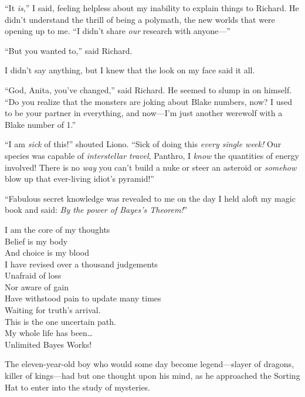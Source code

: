 “It \emph{is},” I said, feeling helpless about my inability to explain things to Richard. He didn’t understand the thrill of being a polymath, the new worlds that were opening up to me. “I didn’t share \emph{our} research with anyone—”

“But you wanted to,” said Richard.

I didn’t say anything, but I knew that the look on my face said it all.

“God, Anita, you’ve changed,” said Richard. He seemed to slump in on himself. “Do you realize that the monsters are joking about Blake numbers, now? I used to be your partner in everything, and now—I’m just another werewolf with a Blake number of 1.”


“I am \emph{sick} of this!” shouted Liono. “Sick of doing this \emph{every single week!} Our species was capable of \emph{interstellar travel}, Panthro, I \emph{know} the quantities of energy involved! There is no \emph{way} you can’t build a nuke or steer an asteroid or \emph{somehow} blow up that ever-living idiot’s pyramid!”

\clearpage
{}

“Fabulous secret knowledge was revealed to me on the day I held aloft my magic book and said: \emph{By the power of Bayes’s Theorem!}”


\begin{emph}
I am the core of my thoughts\\
Belief is my body\\
And choice is my blood\\
I have revised over a thousand judgements\\
Unafraid of loss\\
Nor aware of gain\\
Have withstood pain to update many times\\
Waiting for truth’s arrival.\\
This is the one uncertain path.\\
My whole life has been…\\
Unlimited Bayes Works!
\end{emph}


The eleven-year-old boy who would some day become legend—slayer of dragons, killer of kings—had but one thought upon his mind, as he approached the Sorting Hat to enter into the study of mysteries.

